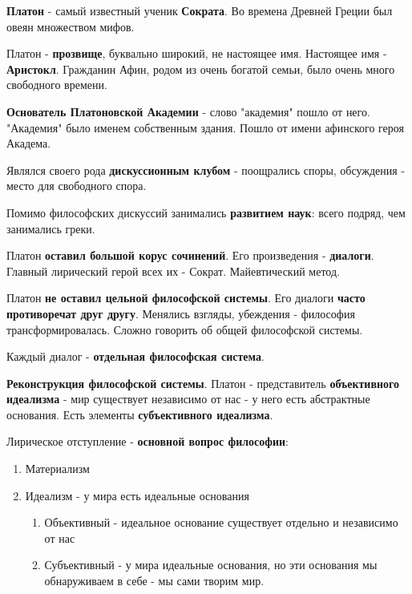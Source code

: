 \documentclass{article}
\begin{document}
\begin{flushleft}
\textbf{Платон} - самый известный ученик \textbf{Сократа}. Во времена Древней Греции был овеян множеством мифов.

\hfill

Платон - \textbf{прозвище}, буквально широкий, не настоящее имя. Настоящее имя - \textbf{Аристокл}. Гражданин Афин, родом из очень богатой семьи, было очень много свободного времени.

\hfill

\textbf{Основатель Платоновской Академии} - слово "академия" пошло от него. "Академия" было именем собственным здания. Пошло от имени афинского героя Академа.

Являлся своего рода \textbf{дискуссионным клубом} - поощрались споры, обсуждения - место для свободного спора.

Помимо философских дискуссий занимались \textbf{развитием наук}: всего подряд, чем занимались греки.

\hfill

Платон \textbf{оставил большой корус сочинений}. Его произведения - \textbf{диалоги}. Главный лирический герой всех их - Сократ. Майевтический метод.

\hfill

Платон \textbf{не оставил цельной философской системы}. Его диалоги \textbf{часто противоречат друг другу}. Менялись взгляды, убеждения - философия трансформировалась. Сложно говорить об общей философской системы.

Каждый диалог - \textbf{отдельная философская система}.

\hfill

\textbf{Реконструкция философской системы}. Платон - представитель \textbf{объективного идеализма} - мир существует независимо от нас - у него есть абстрактные основания. Есть элементы \textbf{субъективного идеализма}.

\hfill

Лирическое отступление - \textbf{основной вопрос философии}:

\begin{enumerate}
    \item Материализм
    \item Идеализм - у мира есть идеальные основания
    \begin{enumerate}
        \item Объективный - идеальное основание существует отдельно и независимо от нас
        \item Субъективный - у мира идеальные основания, но эти основания мы обнаруживаем в себе - мы сами творим мир.
    \end{enumerate}
\end{enumerate}


\end{flushleft}
\end{document}
